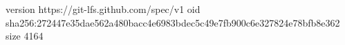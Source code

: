 version https://git-lfs.github.com/spec/v1
oid sha256:272447e35dae562a480bacc4e6983bdec5c49e7fb900c6e327824e78bfb8e362
size 4164
